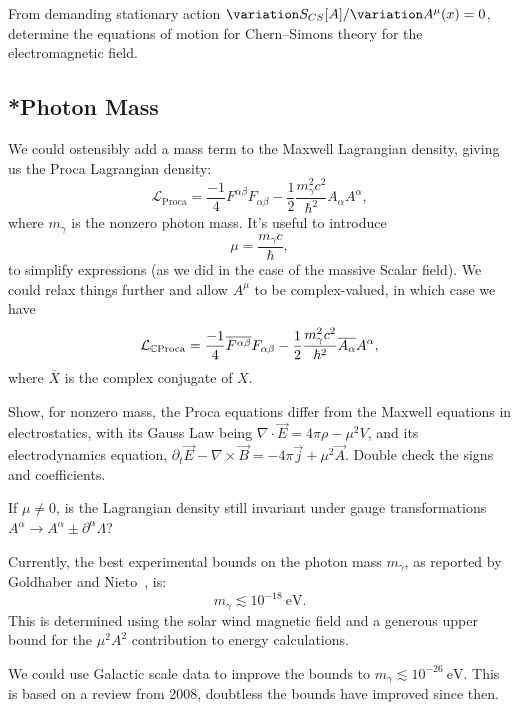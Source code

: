\begin{exercise}
From demanding stationary action $\variation\action_{CS}[A]/\variation A^{\mu}(x)=0$,
determine the equations of motion for Chern--Simons theory for the
electromagnetic field.
\end{exercise}

\subsection{*Photon Mass}

\M
We could ostensibly add a mass term to the Maxwell Lagrangian density,
giving us the Proca Lagrangian density:
\begin{equation}
\mathcal{L}_{\text{Proca}} = \frac{-1}{4}F^{\alpha\beta}F_{\alpha\beta}-\frac{1}{2}\frac{m_{\gamma}^{2}c^{2}}{\hbar^{2}}A_{\alpha}A^{\alpha},
\end{equation}
where $m_{\gamma}$ is the nonzero photon mass. It's useful to introduce
\begin{equation}
\mu = \frac{m_{\gamma}c}{\hbar},
\end{equation}
to simplify expressions (as we did in the case of the massive Scalar
field). We could relax things further and allow $A^{\mu}$ to be
complex-valued, in which case we have 
\begin{equation}
\mathcal{L}_{\mathbb{C}\text{Proca}} = \frac{-1}{4}\overline{F^{\alpha\beta}}F_{\alpha\beta}-\frac{1}{2}\frac{m_{\gamma}^{2}c^{2}}{\hbar^{2}}\overline{A_{\alpha}}A^{\alpha},
\end{equation}
where $\overline{X}$ is the complex conjugate of $X$.

\begin{exercise}
Show, for nonzero mass, the Proca equations differ from the Maxwell
equations in electrostatics, with its Gauss Law being $\nabla\cdot\vec{E}=4\pi\rho-\mu^{2}V$,
and its electrodynamics equation, $\partial_{t}\vec{E}-\nabla\times\vec{B}=-4\pi\vec{j}+\mu^{2}\vec{A}$.
Double check the signs and coefficients.
\end{exercise}

\begin{exercise}
If $\mu\neq0$, is the Lagrangian density still invariant under gauge
transformations $A^{\alpha}\to A^{\alpha}\pm\partial^{\alpha}\Lambda$?
\end{exercise}

Currently, the best experimental bounds on the photon mass $m_{\gamma}$,
as reported by Goldhaber and Nieto~\cite[\S III.B.2]{Goldhaber:2008xy}, is:
\begin{equation}
m_{\gamma}\lesssim10^{-18}~\mathrm{eV}.
\end{equation}
This is determined using the solar wind magnetic field and a generous
upper bound for the $\mu^{2}A^{2}$ contribution to energy calculations.

\begin{remark}
We could use Galactic scale data to improve the bounds to
$m_{\gamma}\lesssim10^{-26}~\mathrm{eV}$. This is based on a review from
2008, doubtless the bounds have improved since then.
\end{remark}
